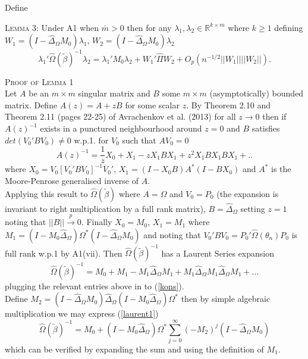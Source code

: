 \documentclass[11pt, fleqn]{article}
\begin{document}
Define

 \textsc{Lemma 3}: Under A1 when $\bar{m}>0$ then for any  $\lambda_1, \lambda_2 \in \mathbb{R}^{k\times m}$ where $k\geq 1$   defining $W_1=(I-\hat{\Delta}_{\Omega}M_0)\lambda_1$, $W_2=(I-\hat{\Delta}_{\Omega}M_0)\lambda_2$  \begin{equation} \label{laur} \lambda_1'\hat{\Omega}(\tilde{\beta})^{-1}\lambda_2= \lambda_1'M_0\lambda_2 + W_1'\hat{\Pi} W_2 +O_p(n^{-1/2}|\!|W_1|\!||\!|W_2|\!|).\end{equation}
 
 
 \textsc{Proof of Lemma 1}\\ Let $A$ be an $m \times m$ singular matrix and $B$ some $m\times m$ (asymptotically) bounded matrix. Define $A(z)=A+zB$ for some scalar $z$.
 By Theorem 2.10 and Theorem 2.11 (pages 22-25) of Avrachenkov et al. (2013)  for all
 $z \rightarrow 0$ then if $A(z)^{-1}$ exists in a punctured neighbourhood around $z=0$ and $B$ satisfies $det(V_0'BV_0)\neq 0$ w.p.1. for $V_0$ such that $AV_0=0$
 \begin{equation} \label{kons} A(z)^{-1}= \frac{1}{z}X_0+ X_1-zX_1BX_1+z^2X_1BX_1BX_1+.. \end{equation}
 where $X_0=V_0[V_0'BV_0]^{-1}V_0'$, $X_1=(I-X_0B)A^*(I-BX_0)$ and $A^*$ is the Moore-Penrose generalised inverse of $A$.\\
 Applying this result to $\hat{\Omega}(\tilde{\beta})$ where $A=\Omega$ and $V_0=P_0$ (the expansion is invariant to right multiplication by a full rank matrix), $B=\hat{\Delta}_{\Omega}$ setting $z=1$ noting that $|\!|B|\!|\overset{p}{\rightarrow} 0$. Finally $X_0=M_0$, $X_1=M_1$ where $M_1=(I- M_0\hat{\Delta}_{\Omega})\Omega^*(I-\hat{\Delta}_{\Omega}M_0)$  and noting that $V_0'BV_0=P_0'\hat{\Omega}(\theta_n)P_0$ is full rank w.p.1 by A1(vii). Then $ \hat{\Omega}(\tilde{\beta})^{-1}$ has a Laurent Series expansion
 \begin{equation} \label{laurent1}\hat{\Omega}(\tilde{\beta})^{-1}= M_0+M_1-M_1\hat{\Delta}_{\Omega}M_1+M_1\hat{\Delta}_{\Omega}M_1\hat{\Delta}_{\Omega}M_1+...
 \end{equation}
 plugging the relevant entries above in to (\ref{kons}).\\
 Define $M_2=(I-\hat{\Delta}_{\Omega}M_0)\hat{\Delta}_{\Omega}(I-M_0\hat{\Delta}_{\Omega})\Omega^*$ then by simple algebraic multiplication we may express (\ref{laurent1})
 \begin{equation} \label{laurent2} \hat{\Omega}(\tilde{\beta})^{-1}= M_0 +(I-M_0\hat{\Delta}_{\Omega})\Omega^*\sum_{j=0}^\infty (-M_2)^j(I-\hat{\Delta}_{\Omega}M_0)\end{equation}
 which can be verified by expanding the sum and using the definition of $M_1$.
 
\end{document}
